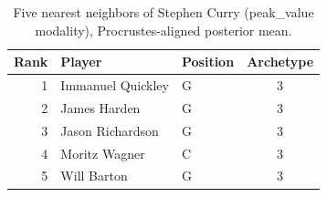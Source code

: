 \begin{table}[htbp]
  \centering\small
  \begin{tabular}{rllc}
    \toprule
    Rank & Player & Position & Archetype \\
    \midrule
    1 & Immanuel Quickley & G & 3 \\
    2 & James Harden & G & 3 \\
    3 & Jason Richardson & G & 3 \\
    4 & Moritz Wagner & C & 3 \\
    5 & Will Barton & G & 3 \\
    \bottomrule
  \end{tabular}
  \caption{Five nearest neighbors of Stephen Curry (peak_value modality), Procrustes-aligned posterior mean.}
  \label{tab:Stephen_Curry_neighbors_peak_value}
\end{table}


